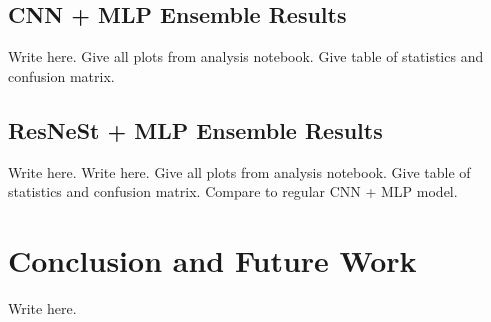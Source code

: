 \documentclass [MAS] {uclathes}
\begin{document}
\section{CNN + MLP Ensemble Results}

Write here. Give all plots from analysis notebook. Give table of statistics and confusion matrix.

\section{ResNeSt + MLP Ensemble Results}

Write here. Write here. Give all plots from analysis notebook. Give table of statistics and confusion matrix. Compare to regular CNN + MLP model.


\chapter{Conclusion and Future Work}

Write here.



\end{document}
